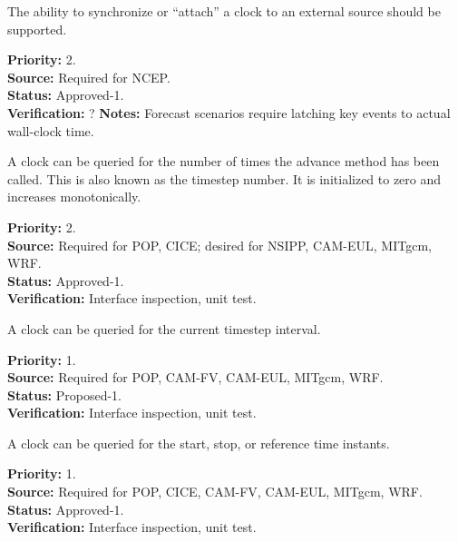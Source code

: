 The ability to synchronize or ``attach'' a clock to an external source should be supported.
\begin{reqlist}
{\bf Priority:} 2.\\
{\bf Source:} Required for NCEP. \\
{\bf Status:} Approved-1. \\
{\bf Verification:} ? 
{\bf Notes:} Forecast scenarios require latching key events to actual wall-clock time. 
\end{reqlist}


A clock can be queried for the number of times the advance method has
been called.  This is also known as the timestep number.  It is initialized to 
zero and increases monotonically.
\begin{reqlist}
{\bf Priority:} 2. \\
{\bf Source:} Required for POP, CICE; desired for NSIPP, CAM-EUL, MITgcm, WRF. \\
{\bf Status:} Approved-1. \\
{\bf Verification:} Interface inspection, unit test. 
\end{reqlist}

A clock can be queried for the current timestep interval.
\begin{reqlist}
{\bf Priority:} 1. \\
{\bf Source:} Required for POP, CAM-FV, CAM-EUL, MITgcm, WRF. \\
{\bf Status:} Proposed-1. \\
{\bf Verification:} Interface inspection, unit test. 
\end{reqlist}

A clock can be queried for the start, stop, or reference time instants.
\begin{reqlist}
{\bf Priority:} 1. \\
{\bf Source:} Required for POP, CICE, CAM-FV, CAM-EUL, MITgcm, WRF. \\
{\bf Status:} Approved-1. \\
{\bf Verification:} Interface inspection, unit test. 
\end{reqlist}

